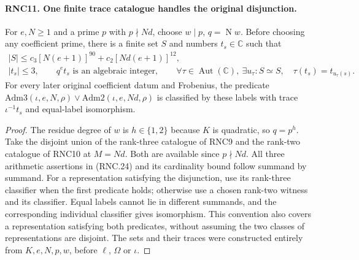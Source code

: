 \paragraph{RNC11. One finite trace catalogue handles the original disjunction.}
\label{claim:RNC11}
For $e,N\geq1$ and a prime $p$ with $p\nmid Nd$, choose
$w\mid p$, $q=\operatorname{N}w$.  Before choosing any
coefficient prime, there is a finite set $S$ and numbers
$t_s\in\mathbb C$ such that
\[
 \begin{gathered}
 |S|\leq c_3[N(e+1)]^{90}
                   +c_2[Nd(e+1)]^{12},\\
 |t_s|\leq3,\qquad q^e t_s\text{ is an algebraic integer},
 \qquad \forall\tau\in\operatorname{Aut}(\mathbb C),\
          \exists u_\tau:S\simeq S,\quad
          \tau(t_s)=t_{u_\tau(s)}.
 \end{gathered}                                                 \tag{RNC.24}
\]
For every later original coefficient datum and Frobenius,
the predicate
$\mathrm{Adm3}(\iota,e,N,\rho)\lor
\mathrm{Adm2}(\iota,e,Nd,\rho)$ is classified by these
labels with trace $\iota^{-1}t_s$ and equal-label
isomorphism.
\begin{proof}
The residue degree of $w$ is $h\in\{1,2\}$ because $K$
is quadratic, so $q=p^h$.  Take the disjoint union of the
rank-three catalogue of RNC9 and the rank-two catalogue
of RNC10 at $M=Nd$.  Both are available since $p\nmid Nd$.
All three arithmetic assertions in (RNC.24) and its
cardinality bound follow summand by summand.  For a
representation satisfying the disjunction, use its
rank-three classifier when the first predicate holds;
otherwise use a chosen rank-two witness and its
classifier.  Equal labels cannot lie in different
summands, and the corresponding individual classifier
gives isomorphism.  This convention also covers a
representation satisfying both predicates, without
assuming the two classes of representations are disjoint.
The sets and their traces were constructed entirely from
$K,e,N,p,w$, before $\ell$, $\Omega$ or $\iota$.
\end{proof}

